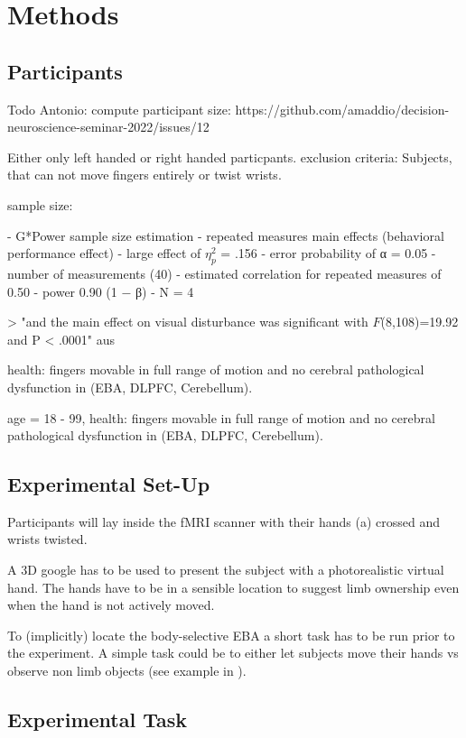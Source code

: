 \documentclass[man]{apa7}
\begin{document}
\parencite{Limanowski2016}


\section{Methods}
\subsection{Participants}
Todo Antonio: compute participant size: https://github.com/amaddio/decision-neuroscience-seminar-2022/issues/12

Either only left handed or right handed particpants.
exclusion criteria: Subjects, that can not move fingers entirely or twist wrists.

sample size:

- G*Power sample size estimation
- repeated measures main effects (behavioral performance effect)
- large effect of $\eta^2_p$ = .156
- error probability of α = 0.05
- number of measurements (40)
- estimated correlation for repeated measures of 0.50
- power 0.90 (1 − β)
- N = 4

> "and the main effect on visual disturbance was significant with $F$(8,108)=19.92 and P < .0001"
aus \parencite{Wei2009}


health: fingers movable in full range of motion and no cerebral pathological dysfunction in (EBA, DLPFC, Cerebellum).

age = 18 - 99, health: fingers movable in full range of motion and no cerebral pathological dysfunction in (EBA, DLPFC, Cerebellum).



\subsection{Experimental Set-Up}

Participants will lay inside the fMRI scanner with their hands (a) crossed and wrists twisted.

A 3D google has to be used to present the subject with a photorealistic virtual hand. The hands have to be in a sensible location to suggest limb ownership even when the hand is not actively moved.

To (implicitly) locate the body-selective EBA a short task has to be run prior to the experiment. A simple task could be to either let subjects move their hands vs observe non limb objects (see example in \cite{Limanowski2016}).

\subsection{Experimental Task}
\end{document}
